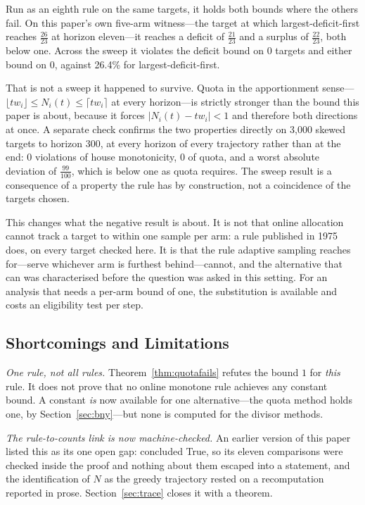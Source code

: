 Run as an eighth rule on the same targets, it holds both bounds where the others fail. On
this paper's own five-arm witness---the target at which largest-deficit-first reaches
$\tfrac{26}{23}$ at horizon eleven---it reaches a deficit of $\tfrac{21}{23}$ and a surplus of
$\tfrac{22}{23}$, both below one. Across the sweep it violates the deficit bound on
0 targets and either bound on 0, against 26.4\% for
largest-deficit-first. \NUM{}

That is not a sweep it happened to survive. Quota in the apportionment sense---$\lfloor t w_{i}\rfloor\le N_{i}(t)\le\lceil t w_{i}\rceil$ at
every horizon---is strictly stronger than the bound this paper is about, because it forces
$|N_{i}(t)-t w_{i}|<1$ and therefore both directions at once. A separate check confirms the
two properties directly on 3{,}000 skewed targets to horizon 300, at every horizon of every
trajectory rather than at the end: 0 violations of house monotonicity, 0 of
quota, and a worst absolute deviation of $\tfrac{99}{100}$, which is below one as quota requires.
The sweep result is a consequence of a property the rule has by construction, not a
coincidence of the targets chosen. \NUM{}

This changes what the negative result is about. It is not that online allocation cannot track
a target to within one sample per arm: a rule published in 1975 does, on every target checked
here. It is that the rule adaptive sampling reaches for---serve whichever arm is furthest
behind---cannot, and the alternative that can was characterised before the question was asked
in this setting. For an analysis that needs a per-arm bound of one, the substitution is
available and costs an eligibility test per step.

\subsection{Shortcomings and Limitations}

\emph{One rule, not all rules.} Theorem~\ref{thm:quotafails} refutes the bound $1$ for
\emph{this} rule. It does not prove that no online monotone rule achieves any constant bound.
A constant \emph{is} now available for one alternative---the quota method holds one, by
Section~\ref{sec:bny}---but none is computed for the divisor methods.

\emph{The rule-to-counts link is now machine-checked.} An earlier version of this paper
listed this as its one open gap:  concluded \textsf{True}, so its eleven
comparisons were checked inside the proof and nothing about them escaped into a statement,
and the identification of $N$ as the greedy trajectory rested on a recomputation reported in
prose. Section~\ref{sec:trace} closes it with a theorem.

